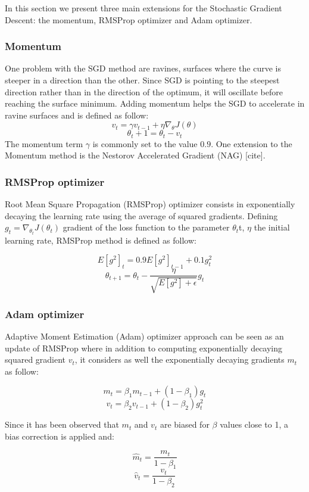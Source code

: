 \documentclass[master, tikz, final,11pt, dvipdfmx]{iscs-thesis}
\begin{document}
In this section we present three main extensions for the Stochastic Gradient Descent: the momentum, RMSProp optimizer and Adam optimizer.
\subsubsection{Momentum}

One problem with the SGD method are ravines, surfaces where the curve is steeper in a direction than the other. Since SGD is pointing to the steepest direction rather than in the direction of the optimum, it will oscillate before reaching the surface minimum. Adding momentum helps the SGD to accelerate in ravine surfaces and is defined as follow:
\[v_t = \gamma v_{t-1} + \eta \nabla_\theta J(\theta)\]
\[\theta_t+1 = \theta_t - v_t\]
The momentum term $\gamma$ is commonly set to the value $0.9$. One extension to the Momentum method is the Nestorov Accelerated Gradient (NAG) [cite].
\subsubsection{RMSProp optimizer}
Root Mean Square Propagation (RMSProp) optimizer \cite{hinton2012neural} consists in exponentially decaying the learning rate using the average of squared gradients.
Defining $g_t = \nabla_{\theta_t}J(\theta_t)$ gradient of the loss function to the parameter $\theta_t$t, $\eta$ the initial learning rate, RMSProp method is defined as follow:

\[E[g^2]_t = 0.9E[g^2]_{t-1} +0.1g^2_t\]
\[\theta_{t+1} = \theta_t - \frac{\eta}{\sqrt{E[g^2]+\epsilon}} g_t\]

\subsubsection{Adam optimizer}


Adaptive Moment Estimation (Adam) optimizer \cite{ADAM} approach can be seen as an update of RMSProp where in addition to computing exponentially decaying squared gradient $v_t$, it considers as well the exponentially decaying gradients $m_t$ as follow:

\[m_t = \beta_1 m_{t-1} + (1-\beta_1)g_t\]
\[v_t = \beta_2 v_{t-1} + (1-\beta_2)g_t^2\]

Since it has been observed that $m_t$ and $v_t$ are biased for $\beta$ values close to 1, a bias correction is applied and:

\[\hat m_t = \frac{m_t}{1-\beta_1}\]
\[\hat v_t = \frac{v_t}{1-\beta_2}\]
\end{document}
